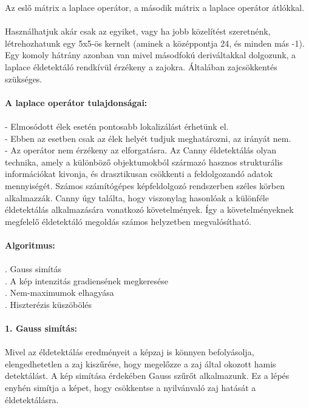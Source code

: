 Az eslő mátrix a laplace operátor, a második mátrix a laplace operátor átlókkal.\\ \\
Használhatjuk akár csak az egyiket, vagy ha jobb közelítést szeretnénk, létrehozhatunk egy 5x5-ös kernelt (aminek a középpontja 24, és minden más -1). Egy komoly hátrány azonban van mivel másodfokú deriváltakkal dolgozunk, a laplace éldetektáló rendkívül érzékeny a zajokra. Általában zajcsökkentés szükséges.
\\ \\
\textbf{A laplace operátor tulajdonságai:}\\ \\
\indent - Elmosódott élek esetén pontosabb lokalizálást érhetünk el.\\
\indent - Ebben az esetben csak az élek helyét tudjuk meghatározni, az irányát nem.\\
\indent - Az operátor nem érzékeny az elforgatásra.
Az Canny éldetektálás olyan technika, amely a különböző objektumokból származó hasznos strukturális információkat kivonja, és drasztikusan csökkenti a feldolgozandó adatok mennyiségét. Számos számítógépes képfeldolgozó rendszerben széles körben alkalmazzák. Canny úgy találta, hogy viszonylag hasonlóak a különféle éldetektálás alkalmazására vonatkozó követelmények. Így a követelményeknek megfelelő éldetektáló megoldás számos helyzetben megvalósítható. 
\\ \\
\textbf{Algoritmus:}\\ \\
. Gauss simítás\\
. A kép intenzitás gradiensének megkeresése\\
. Nem-maximumok elhagyása\\
. Hiszterézis küszöbölés \\ 
\\
\textbf{1. Gauss simítás:}\\ \\
Mivel az éldetektálás eredményeit a képzaj is könnyen befolyásolja, elengedhetetlen a zaj kiszűrése, hogy megelőzze a zaj által okozott hamis detektálást. A kép simítása érdekében Gauss szűrőt alkalmazunk. Ez a lépés enyhén simítja a képet, hogy csökkentse a nyilvánvaló zaj hatását a éldetektálásra.
\\ \\

